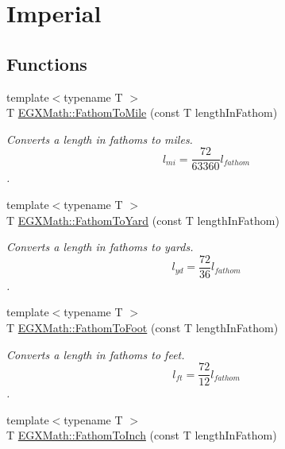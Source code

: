 \hypertarget{group___e_g_x_math-_conversions-_length_conversions-_nautical-_fathom-_imperial}{}\section{Imperial}
\label{group___e_g_x_math-_conversions-_length_conversions-_nautical-_fathom-_imperial}
\subsection*{Functions}
\begin{DoxyCompactItemize}
\item 
{\footnotesize template$<$typename T $>$ }\\T \mbox{\hyperlink{group___e_g_x_math-_conversions-_length_conversions-_nautical-_fathom-_imperial_ga4922ca5fe88bedc7aaa78d15e64a5534}{E\+G\+X\+Math\+::\+Fathom\+To\+Mile}} (const T length\+In\+Fathom)
\begin{DoxyCompactList}\small\item\em Converts a length in fathoms to miles. \[ l_{mi}=\frac{72}{63360} l_{fathom} \]. \end{DoxyCompactList}\item 
{\footnotesize template$<$typename T $>$ }\\T \mbox{\hyperlink{group___e_g_x_math-_conversions-_length_conversions-_nautical-_fathom-_imperial_ga1f8085825612168639f1db2cd20432cb}{E\+G\+X\+Math\+::\+Fathom\+To\+Yard}} (const T length\+In\+Fathom)
\begin{DoxyCompactList}\small\item\em Converts a length in fathoms to yards. \[ l_{yd}= \frac{72}{36} l_{fathom} \]. \end{DoxyCompactList}\item 
{\footnotesize template$<$typename T $>$ }\\T \mbox{\hyperlink{group___e_g_x_math-_conversions-_length_conversions-_nautical-_fathom-_imperial_ga71995f5dd30211dc6c7c601d26a5fec8}{E\+G\+X\+Math\+::\+Fathom\+To\+Foot}} (const T length\+In\+Fathom)
\begin{DoxyCompactList}\small\item\em Converts a length in fathoms to feet. \[ l_{ft}= \frac{72}{12} l_{fathom} \]. \end{DoxyCompactList}\item 
{\footnotesize template$<$typename T $>$ }\\T \mbox{\hyperlink{group___e_g_x_math-_conversions-_length_conversions-_nautical-_fathom-_imperial_ga92c156dbffb555541217b319e8cafb72}{E\+G\+X\+Math\+::\+Fathom\+To\+Inch}} (const T length\+In\+Fathom)

\end{DoxyCompactItemize}
